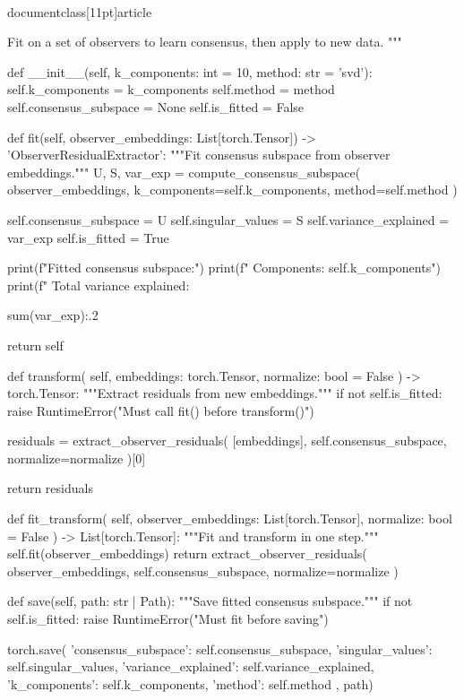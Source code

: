 \\documentclass[11pt]{article}
\begin{document}
\begin{CodeBlock}
    Fit on a set of observers to learn consensus, then apply to new data.
    """
    
    def __init__(self, k_components: int = 10, method: str = 'svd'):
        self.k_components = k_components
        self.method = method
        self.consensus_subspace = None
        self.is_fitted = False
    
    def fit(self, observer_embeddings: List[torch.Tensor]) -> 'ObserverResidualExtractor':
        """Fit consensus subspace from observer embeddings."""
        U, S, var_exp = compute_consensus_subspace(
            observer_embeddings,
            k_components=self.k_components,
            method=self.method
        )
        
        self.consensus_subspace = U
        self.singular_values = S
        self.variance_explained = var_exp
        self.is_fitted = True
        
        print(f"Fitted consensus subspace:")
        print(f"  Components: {self.k_components}")
        print(f"  Total variance explained: {sum(var_exp):.2%
        
        return self
    
    def transform(
        self,
        embeddings: torch.Tensor,
        normalize: bool = False
    ) -> torch.Tensor:
        """Extract residuals from new embeddings."""
        if not self.is_fitted:
            raise RuntimeError("Must call fit() before transform()")
        
        residuals = extract_observer_residuals(
            [embeddings],
            self.consensus_subspace,
            normalize=normalize
        )[0]
        
        return residuals
    
    def fit_transform(
        self,
        observer_embeddings: List[torch.Tensor],
        normalize: bool = False
    ) -> List[torch.Tensor]:
        """Fit and transform in one step."""
        self.fit(observer_embeddings)
        return extract_observer_residuals(
            observer_embeddings,
            self.consensus_subspace,
            normalize=normalize
        )
    
    def save(self, path: str | Path):
        """Save fitted consensus subspace."""
        if not self.is_fitted:
            raise RuntimeError("Must fit before saving")
        
        torch.save({
            'consensus_subspace': self.consensus_subspace,
            'singular_values': self.singular_values,
            'variance_explained': self.variance_explained,
            'k_components': self.k_components,
            'method': self.method
        }, path)
        
}
\end{CodeBlock}
\end{document}
